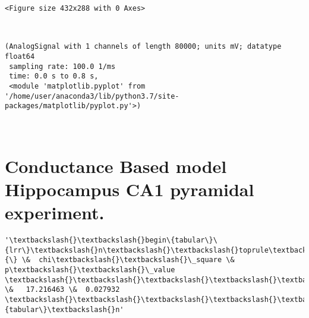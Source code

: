 \documentclass[11pt]{article}
\begin{document}
    
    \begin{verbatim}
<Figure size 432x288 with 0 Axes>
    \end{verbatim}

    
    \begin{center}
    \end{center}
    { \hspace*{\fill} \\}
    
            \begin{tcolorbox}[breakable, size=fbox, boxrule=.5pt, pad at break*=1mm, opacityfill=0]
\begin{Verbatim}[commandchars=\\\{\}]
(AnalogSignal with 1 channels of length 80000; units mV; datatype float64
 sampling rate: 100.0 1/ms
 time: 0.0 s to 0.8 s,
 <module 'matplotlib.pyplot' from '/home/user/anaconda3/lib/python3.7/site-
packages/matplotlib/pyplot.py'>)
\end{Verbatim}
\end{tcolorbox}
        
    \begin{center}
    \end{center}
    { \hspace*{\fill} \\}
    
    \hypertarget{conductance-based-model-hippocampus-ca1-pyramidal-experiment.}{%
\section{Conductance Based model Hippocampus CA1 pyramidal
experiment.}\label{conductance-based-model-hippocampus-ca1-pyramidal-experiment.}}

            \begin{tcolorbox}[breakable, size=fbox, boxrule=.5pt, pad at break*=1mm, opacityfill=0]
\begin{Verbatim}[commandchars=\\\{\}]
'\textbackslash{}\textbackslash{}begin\{tabular\}\{lrr\}\textbackslash{}n\textbackslash{}\textbackslash{}toprule\textbackslash{}n\{\} \&  chi\textbackslash{}\textbackslash{}\_square \&   p\textbackslash{}\textbackslash{}\_value
\textbackslash{}\textbackslash{}\textbackslash{}\textbackslash{}\textbackslash{}n\textbackslash{}\textbackslash{}midrule\textbackslash{}n0 \&   17.216463 \&  0.027932
\textbackslash{}\textbackslash{}\textbackslash{}\textbackslash{}\textbackslash{}n\textbackslash{}\textbackslash{}bottomrule\textbackslash{}n\textbackslash{}\textbackslash{}end\{tabular\}\textbackslash{}n'
\end{Verbatim}
\end{tcolorbox}
        
\end{document}
